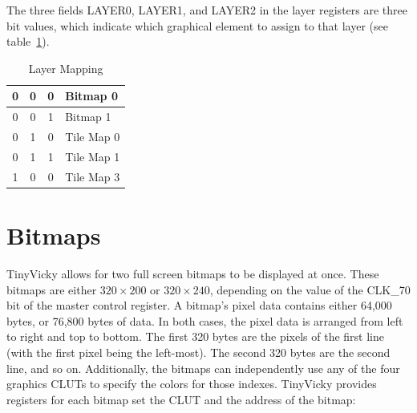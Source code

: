 The three fields LAYER0, LAYER1, and LAYER2 in the layer registers are three bit values, which indicate which graphical element to assign to that layer (see table~\ref{tab:bm_tm_lay_mapping}).

\begin{table}[h]
    \begin{center}
        \begin{tabular}{|c|c|c||l|} \hline
            0 & 0 & 0 & Bitmap 0 \\\hline
            0 & 0 & 1 & Bitmap 1 \\\hline
            0 & 1 & 0 & Tile Map 0 \\\hline
            0 & 1 & 1 & Tile Map 1 \\\hline
            1 & 0 & 0 & Tile Map 3 \\\hline
        \end{tabular}
    \end{center}
    \caption{Layer Mapping}
    \label{tab:bm_tm_lay_mapping}
\end{table}

\section{Bitmaps}

TinyVicky allows for two full screen bitmaps to be displayed at once. These bitmaps are either $320 \times 200$ or $320 \times 240$, depending on the value of the CLK\_70 bit of the master control register. A bitmap's pixel data contains either 64,000 bytes, or 76,800 bytes of data. In both cases, the pixel data is arranged from left to right and top to bottom. The first 320 bytes are the pixels of the first line (with the first pixel being the left-most). The second 320 bytes are the second line, and so on. Additionally, the bitmaps can independently use any of the four graphics CLUTs to specify the colors for those indexes. TinyVicky provides registers for each bitmap set the CLUT and the address of the bitmap:

